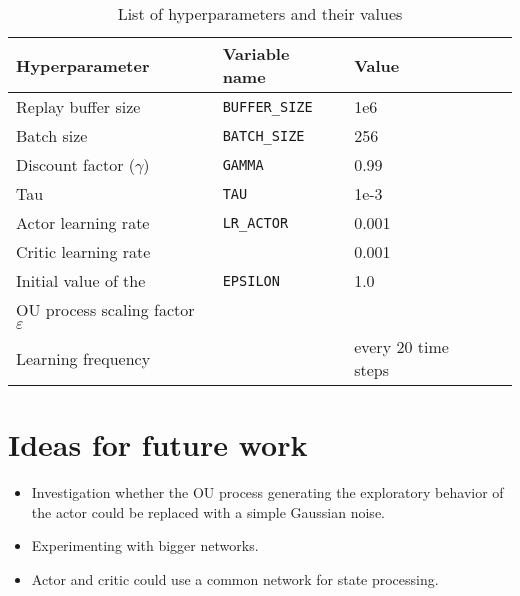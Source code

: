 \documentclass[a4paper,12pt]{amsart}
\begin{document}
\begin{table}
\caption{List of hyperparameters and their values}
\begin{tabular}{|l|l|l|l|}
    \hline
Hyperparameter & Variable name & Value \\ 
    \hline \hline
    Replay buffer size & \texttt{BUFFER\_SIZE} &  1e6 \\ \hline
    Batch size & \texttt{BATCH\_SIZE} &  256  \\  \hline
    Discount factor ($\gamma$) & \texttt{GAMMA} &  0.99 \\ \hline
    Tau & \texttt{TAU} & 1e-3 \\ \hline
    Actor learning rate & \texttt{LR\_ACTOR} & 0.001 \\ \hline
    Critic learning rate & \texttt{} & 0.001 \\ \hline
    Initial value of the & \texttt{EPSILON} & 1.0 \\
    OU process scaling factor $\varepsilon$ && \\ \hline
    Learning frequency & \texttt{} &  every 20 time steps \\ \hline
\end{tabular}
\label{tab:hyperparameters}
\end{table}


\section{Ideas for future work}



\begin{itemize}
    \item Investigation whether the OU process generating the exploratory
        behavior of the actor could be replaced with a simple Gaussian noise.
    \item Experimenting with bigger networks.
    \item Actor and critic could use a common network for state processing. 
\end{itemize}




\nocite{Cinlar2011}
\nocite{lillicrap2015continuous}
\printbibliography
\end{document}
